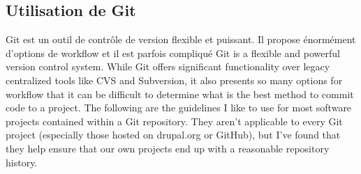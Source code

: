 \subsection{Utilisation de Git}
\label{sub:utilisation de Git}
Git est un outil de contrôle de version flexible et puissant.
Il propose énormément d'options de workflow et il est parfois compliqué
Git is a flexible and powerful version control system. While Git offers significant functionality over legacy centralized tools like CVS and Subversion, it also presents so many options for workflow that it can be difficult to determine what is the best method to commit code to a project. The following are the guidelines I like to use for most software projects contained within a Git repository. They aren't applicable to every Git project (especially those hosted on drupal.org or GitHub), but I've found that they help ensure that our own projects end up with a reasonable repository history.
